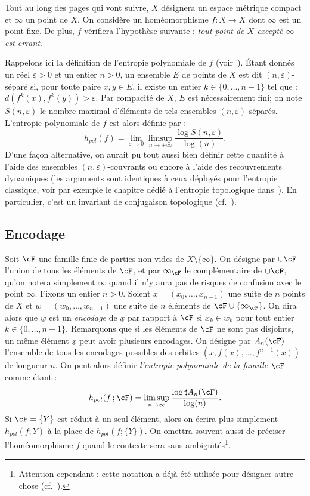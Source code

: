 
Tout au long des pages qui vont suivre, $X$ désignera un espace métrique compact et $\infty$ un point de $X$. On considère un homéomorphisme $f:X \to X$ dont $\infty$ est un point fixe. De plus, $f$ vérifiera l'hypothèse suivante : \emph{tout point de $X$ excepté $\infty$ est errant}.

Rappelons ici la définition de l'entropie polynomiale de $f$ (voir~\cite{Mar13}). \'Etant donnés un réel $\varepsilon>0$ et un entier $n > 0$, un ensemble $E$ de points de $X$ est dit $(n,\varepsilon)$-séparé si, pour toute paire $x,y \in E$, il existe un entier $k \in \{0, \dots, n-1\}$ tel que : $d(f^k(x), f^k(y))>\varepsilon$. Par compacité de $X$, $E$ est nécessairement fini; on note $S(n,\varepsilon)$ le nombre maximal d'éléments de tels ensembles $(n,\varepsilon)$-séparés. L'entropie polynomiale de $f$ est alors définie par :
\[
h_{pol}(f) = \lim_{\varepsilon \to 0} \limsup_{n \to +\infty} \frac{\log S(n,\varepsilon)}{\log (n)}.
\]
D'une façon alternative, on aurait pu tout aussi bien définir cette quantité
à l'aide des ensembles $(n,\varepsilon)$-couvrants ou encore à l'aide des recouvrements dynamiques (les arguments sont identiques à ceux déployés pour l'entropie classique, voir par exemple le chapitre dédié à l'entropie topologique dans~\cite{Wal82}). En particulier, c'est un invariant de conjugaison topologique (cf.~\cite{Mar13}).

\subsection{Encodage}\label{ss.coding}

Soit $\cF$ une famille finie de parties non-vides de $X \setminus \{\infty\}$. On désigne par $\cup \cF$ l'union de tous les éléments de $\cF$, et par $\infty_\cF$ le complémentaire de $\cup \cF$, qu'on notera simplement $\infty$ quand il n'y aura pas de risques de confusion avec le point $\infty$. Fixons un entier $n>0$. Soient $\underline{x} = (x_{0}, \dots, x_{n-1})$ une suite de $n$ points de $X$ et $\underline{w} = (w_0, \dots, w_{n-1})$ une suite de $n$ éléments de $\cF\cup\{\infty_\cF\}$. On dira alors que $\underline{w}$ est un \emph{encodage} de $\underline{x}$ par rapport à $\cF$ si $x_{k} \in w_k$ pour tout entier $k \in \{0, \dots, n-1\}$. Remarquons que si les éléments de $\cF$ ne sont pas disjoints, un même élément $\underline{x}$ peut avoir plusieurs encodages. On désigne par $A_{n}(\cF)$ l'ensemble de tous les encodages possibles des orbites $(x, f(x), \dots, f^{n-1}(x))$ de longueur $n$. On peut alors définir \emph{l'entropie polynomiale de la famille $\cF$} comme étant :
\[
h_{pol}(f \,; \cF) = \limsup_{n \to \infty} \frac{\log \sharp A_{n}(\cF)}{\log (n)}.
\]
Si $\cF = \{Y\}$ est réduit à un seul élément, alors on écrira plus simplement $h_{pol}(f; Y)$ à la place de $h_{pol}(f; \{Y\})$. On omettra souvent aussi de préciser l'homéomorphisme \og $f$\fg{} quand le contexte sera sans ambigu\"{\i}tés\footnote{Attention cependant : cette notation a déjà été utilisée pour désigner autre chose (cf.~\cite[définition~1]{Mar13}).}.

